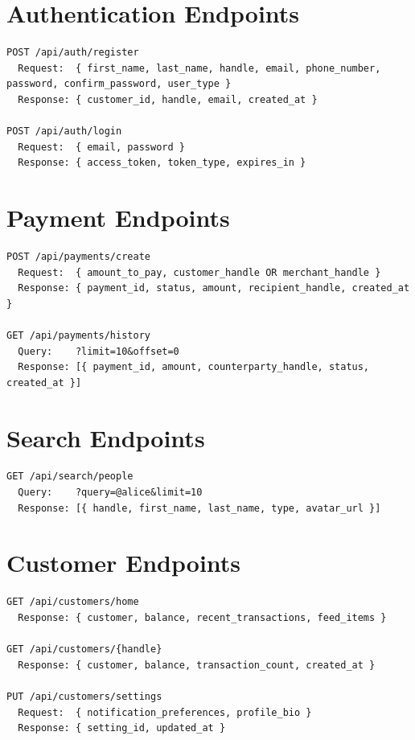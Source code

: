 \documentclass[12pt, a4paper, twoside, openright]{report}
\begin{document}
\section{Authentication Endpoints}

\begin{lstlisting}
POST /api/auth/register
  Request:  { first_name, last_name, handle, email, phone_number, password, confirm_password, user_type }
  Response: { customer_id, handle, email, created_at }
  
POST /api/auth/login
  Request:  { email, password }
  Response: { access_token, token_type, expires_in }
\end{lstlisting}

\section{Payment Endpoints}

\begin{lstlisting}
POST /api/payments/create
  Request:  { amount_to_pay, customer_handle OR merchant_handle }
  Response: { payment_id, status, amount, recipient_handle, created_at }
  
GET /api/payments/history
  Query:    ?limit=10&offset=0
  Response: [{ payment_id, amount, counterparty_handle, status, created_at }]
\end{lstlisting}

\section{Search Endpoints}

\begin{lstlisting}
GET /api/search/people
  Query:    ?query=@alice&limit=10
  Response: [{ handle, first_name, last_name, type, avatar_url }]
\end{lstlisting}

\section{Customer Endpoints}

\begin{lstlisting}
GET /api/customers/home
  Response: { customer, balance, recent_transactions, feed_items }
  
GET /api/customers/{handle}
  Response: { customer, balance, transaction_count, created_at }
  
PUT /api/customers/settings
  Request:  { notification_preferences, profile_bio }
  Response: { setting_id, updated_at }
\end{lstlisting}
\end{document}
